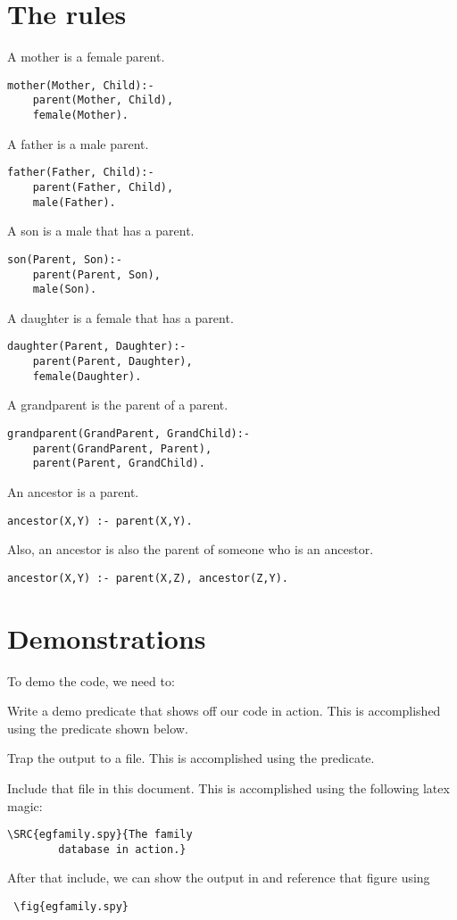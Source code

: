 \documentclass[twocolumn,global]{svjour}
\begin{document}
\section{ The rules  }
A mother is a female parent. 
\begin{Verbatim}
mother(Mother, Child):-
    parent(Mother, Child),
    female(Mother).        
\end{Verbatim}
A father is a male parent.
\begin{Verbatim}
father(Father, Child):-
    parent(Father, Child),
    male(Father).      
\end{Verbatim}
A son is a male that has a parent. 
\begin{Verbatim}
son(Parent, Son):-
    parent(Parent, Son),
    male(Son).
\end{Verbatim}
A daughter is a female that has a parent.
\begin{Verbatim}
daughter(Parent, Daughter):-
    parent(Parent, Daughter),
    female(Daughter).
\end{Verbatim}
A grandparent is the parent of a parent. 
\begin{Verbatim}
grandparent(GrandParent, GrandChild):-
    parent(GrandParent, Parent),
    parent(Parent, GrandChild).
\end{Verbatim}
An ancestor is a parent. 
\begin{Verbatim}
ancestor(X,Y) :- parent(X,Y).
\end{Verbatim}
Also, an ancestor is also the parent of someone who is an ancestor. 
\begin{Verbatim}
ancestor(X,Y) :- parent(X,Z), ancestor(Z,Y).
\end{Verbatim}
\section{ Demonstrations}
 To demo the code, we need to:
\bi
\item Write a demo predicate that shows off our code in action.
 This is accomplished using
the  predicate shown below. 
\item Trap the output to a file. This is accomplished using
the  predicate.
\item Include that file in this document. This is accomplished using
the following latex magic:
\begin{verbatim}
\SRC{egfamily.spy}{The family 
        database in action.}
\end{verbatim}
After that include, we can show the output in 
and reference that figure using
\begin{verbatim}
 \fig{egfamily.spy}
\end{verbatim}
\ei
\end{document}
